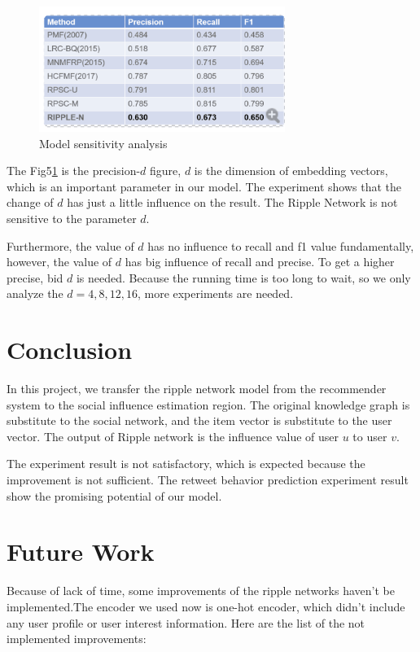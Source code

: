 \documentclass{acmtog} %
\begin{document}
\begin{figure}
    \centering
    \includegraphics[width=8cm]{re.png}
    \caption{Model sensitivity analysis}
    \label{fig:sen}
\end{figure}

The Fig5\ref{fig:sen} is the precision-$d$ figure, $d$ is the dimension of embedding vectors, which is an important parameter in our model. The experiment shows that the change of $d$ has just a little influence on the result. The Ripple Network is not sensitive to the parameter $d$.

Furthermore, the value of $d$ has no influence to recall and f1 value fundamentally, however, the value of $d$ has big influence of recall and precise. To get a higher precise, bid $d$ is needed. Because the running time is too long to wait, so we only analyze the $d = 4, 8, 12 ,16$, more experiments are needed.

\section{Conclusion}

In this project, we transfer the ripple network model from the recommender system to the social influence estimation region. The original knowledge graph is substitute to the social network, and the item vector is substitute to the user vector. The output of Ripple network is the influence value of user $u$ to user $v$. 

The experiment result is not satisfactory, which is expected because the improvement is not sufficient. The retweet behavior prediction experiment result show the promising potential of our model.


\section{Future Work}
Because of lack of time, some improvements of the ripple networks haven't be implemented.The encoder we used now is one-hot encoder, which didn't include any user profile or user interest information. Here are the list of the not implemented improvements:
\end{document}
